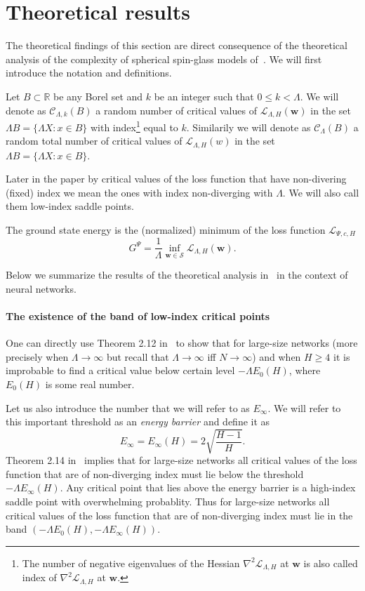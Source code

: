 \documentclass[twoside]{article}
\begin{document}
\section{Theoretical results}
\label{sec:theory}
The theoretical findings of this section are direct consequence of the theoretical analysis of the complexity of spherical spin-glass models of~\cite{AAC2010}. We will first introduce the notation and definitions. 
\begin{definition}
Let $B \subset \mathbb{R}$ be any Borel set and $k$ be an integer such that $0 \leq k < \Lambda$. We will denote as $\mathcal{C}_{\Lambda,k}(B)$ a random number of critical values of $\mathcal{L}_{\Lambda,H}({\bm w})$ in the set $\Lambda B = \{\Lambda X:x\in B\}$ with index\footnote{The number of negative eigenvalues of the Hessian $\nabla^2\mathcal{L}_{\Lambda,H}$ at ${\bm w}$ is also called index of $\nabla^2\mathcal{L}_{\Lambda,H}$ at ${\bm w}$.} equal to $k$. Similarily we will denote as $\mathcal{C}_{\Lambda}(B)$ a random total number of critical values of $\mathcal{L}_{\Lambda,H}(w)$ in the set $\Lambda B = \{\Lambda X:x\in B\}$.
\end{definition}
Later in the paper by critical values of the loss function that have non-divering (fixed) index we mean the ones with index non-diverging with $\Lambda$. We will also call them low-index saddle points.

\begin{definition}
The ground state energy is the (normalized) minimum of the loss function $\mathcal{L}_{\Psi,c,H}$
\[G^\Psi = \frac{1}{\Lambda}\inf_{{\bm w}\in \mathcal{S}}\mathcal{L}_{\Lambda,H}({\bm w}).
\]
\end{definition}

Below we summarize the results of the theoretical analysis in~\cite{AAC2010} in the context of neural networks.
\paragraph{The existence of the band of low-index critical points}
One can directly use Theorem 2.12 in~\cite{AAC2010} to show that for large-size networks (more precisely when $\Lambda \rightarrow \infty$ but recall that $\Lambda \rightarrow \infty$ iff $N \rightarrow \infty$) and when $H \geq 4$ it is improbable to find a critical value below certain level $-\Lambda E_0(H)$, where $E_0(H)$ is some real number. 

Let us also  introduce the number that we will refer to as $E_{\infty}$. We will refer to this important threshold as an \textit{energy barrier} and define it as
\[E_{\infty} = E_{\infty}(H) = 2\sqrt{\frac{H-1}{H}}.
\]
Theorem 2.14 in~\cite{AAC2010} implies that for large-size networks all critical values of the loss function that are of non-diverging index must lie below the threshold $-\Lambda E_{\infty}(H)$. Any critical point that lies above the energy barrier is a high-index saddle point with overwhelming probablity. Thus for large-size networks all critical values of the loss function that are of non-diverging index must lie in the band $\left(-\Lambda E_0(H),-\Lambda E_{\infty}(H)\right)$.
\end{document}
